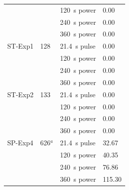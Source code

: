 {\begin{longtable}{p{}p{}p{}p{}p{}p{}p{}p{}}
 &  & 120~s power & \multicolumn{5}{l}{0.00} \\
 &  & 240~s power & \multicolumn{5}{l}{0.00} \\
 &  & 360~s power & \multicolumn{5}{l}{0.00} \\
ST-Exp1 & 128 & 21.4~s pulse & \multicolumn{5}{l}{0.00} \\
 &  & 120~s power & \multicolumn{5}{l}{0.00} \\
 &  & 240~s power & \multicolumn{5}{l}{0.00} \\
 &  & 360~s power & \multicolumn{5}{l}{0.00} \\
ST-Exp2 & 133 & 21.4~s pulse & \multicolumn{5}{l}{0.00} \\
 &  & 120~s power & \multicolumn{5}{l}{0.00} \\
 &  & 240~s power & \multicolumn{5}{l}{0.00} \\
 &  & 360~s power & \multicolumn{5}{l}{0.00} \\
SP-Exp4 & 626$^{a}$ & 21.4~s pulse & \multicolumn{5}{l}{32.67} \\
 &  & 120~s power & \multicolumn{5}{l}{40.35} \\
 &  & 240~s power & \multicolumn{5}{l}{76.86} \\
 &  & 360~s power & \multicolumn{5}{l}{115.30} \\
\bottomrule
\end{longtable}
}
